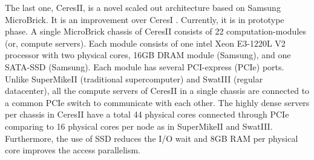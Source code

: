 \documentclass[conference]{IEEEtran}
\begin{document}
The last one, CeresII, is a novel scaled out architecture based on Samsung MicroBrick.
It is an improvement over CeresI \cite{Cluster:ceres1}. 
Currently, it is in prototype phase.  
A single MicroBrick chassis of CeresII consists of 22 computation-modules (or, compute servers). 
Each module consists of one intel Xeon E3-1220L V2 processor with two physical cores, 16GB DRAM module (Samsung), and  one SATA-SSD (Samsung).
Each module has several PCI-express (PCIe) ports. 
Unlike SuperMikeII (traditional supercomputer) and SwatIII (regular datacenter), all the compute servers of CeresII in a single chassis are connected to a common PCIe switch to communicate with each other. 
The highly dense servers per chassis in CeresII have a total 44 physical cores connected through PCIe comparing to 16 physical cores per node as in SuperMikeII and SwatIII.
Furthermore, the use of SSD reduces the I/O wait and 8GB RAM per physical core improves the access parallelism. 

\end{document}
